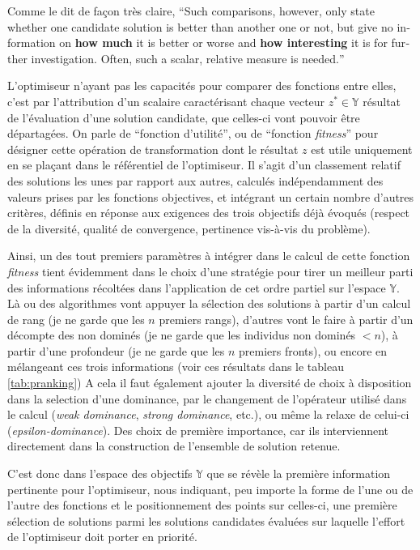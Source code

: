Comme le dit de façon très claire,\textcite[94]{Weise2011} \foreignquote{english}{Such comparisons, however, only state whether one candidate solution is better than another one or not, but give no information on \textbf{how much} it is better or worse and \textbf{how interesting} it is for further investigation. Often, such a scalar, relative measure is needed.}

L'optimiseur n'ayant pas les capacités pour comparer des fonctions entre elles, c'est par l'attribution d'un scalaire caractérisant chaque vecteur $z^* \in \mathbb{Y}$ résultat de l'évaluation d'une solution candidate, que celles-ci vont pouvoir être départagées. On parle de \enquote{fonction d'utilité}, ou de \enquote{fonction \textit{fitness}} pour désigner cette opération de transformation dont le résultat $z$ est utile uniquement en se plaçant dans le référentiel de l'optimiseur. Il s'agit d'un classement relatif des solutions les unes par rapport aux autres, calculés indépendamment des valeurs prises par les fonctions objectives, et intégrant un certain nombre d'autres critères, définis en réponse aux exigences des trois objectifs déjà évoqués (respect de la diversité, qualité de convergence, pertinence vis-à-vis du problème).

Ainsi, un des tout premiers paramètres à intégrer dans le calcul de cette fonction \textit{fitness} tient évidemment dans le choix d'une stratégie pour tirer un meilleur parti des informations récoltées dans l'application de cet ordre partiel sur l'espace $\mathbb{Y}$. Là ou des algorithmes vont appuyer la sélection des solutions à partir d'un calcul de rang (je ne garde que les $n$ premiers rangs), d'autres vont le faire à partir d'un décompte des non dominés (je ne garde que les individus non dominés $< n$), à partir d'une profondeur (je ne garde que les $n$ premiers fronts), ou encore en mélangeant ces trois informations (voir ces résultats dans le tableau \ref{tab:pranking}) A cela il faut également ajouter la diversité de choix à disposition dans la selection d'une dominance, par le changement de l'opérateur utilisé dans le calcul (\textit{weak dominance}, \textit{strong dominance}, etc.), ou même la relaxe de celui-ci (\textit{epsilon-dominance}). Des choix de première importance, car ils interviennent directement dans la construction de l'ensemble de solution retenue.

C'est donc dans l'espace des objectifs $\mathbb{Y}$ que se révèle la première information pertinente pour l'optimiseur, nous indiquant, peu importe la forme de l'une ou de l'autre des fonctions et le positionnement des points sur celles-ci, une première sélection de solutions parmi les solutions candidates évaluées sur laquelle l'effort de l'optimiseur doit porter en priorité.

